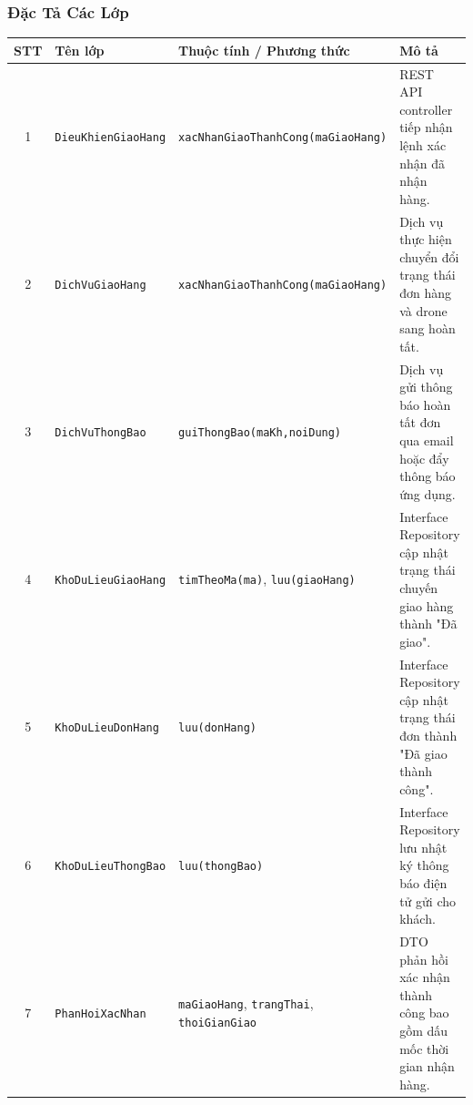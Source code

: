 \subsubsection{Đặc Tả Các Lớp}
\begin{table}[H]
  \centering
  \small
  \begin{tabularx}{\textwidth}{|c|>{\raggedright\arraybackslash}p{3.5cm}|>{\raggedright\arraybackslash}p{4.5cm}|>{\raggedright\arraybackslash}X|}
    \hline
    \textbf{STT} & \textbf{Tên lớp} & \textbf{Thuộc tính / Phương thức} & \textbf{Mô tả} \\
    \hline
    1 & \texttt{Dieu\allowbreak Khien\allowbreak Giao\allowbreak Hang} & \texttt{xac\allowbreak Nhan\allowbreak Giao\allowbreak Thanh\allowbreak Cong\allowbreak (ma\allowbreak Giao\allowbreak Hang)} & REST API controller tiếp nhận lệnh xác nhận đã nhận hàng. \\ \hline
    2 & \texttt{Dich\allowbreak Vu\allowbreak Giao\allowbreak Hang} & \texttt{xac\allowbreak Nhan\allowbreak Giao\allowbreak Thanh\allowbreak Cong\allowbreak (ma\allowbreak Giao\allowbreak Hang)} & Dịch vụ thực hiện chuyển đổi trạng thái đơn hàng và drone sang hoàn tất. \\ \hline
    3 & \texttt{Dich\allowbreak Vu\allowbreak Thong\allowbreak Bao} & \texttt{gui\allowbreak Thong\allowbreak Bao\allowbreak (ma\allowbreak Kh,\allowbreak noi\allowbreak Dung)} & Dịch vụ gửi thông báo hoàn tất đơn qua email hoặc đẩy thông báo ứng dụng. \\ \hline
    4 & \texttt{Kho\allowbreak Du\allowbreak Lieu\allowbreak Giao\allowbreak Hang} & \texttt{tim\allowbreak Theo\allowbreak Ma\allowbreak (ma)}, \texttt{luu\allowbreak (giao\allowbreak Hang)} & Interface Repository cập nhật trạng thái chuyến giao hàng thành "Đã giao". \\ \hline
    5 & \texttt{Kho\allowbreak Du\allowbreak Lieu\allowbreak Don\allowbreak Hang} & \texttt{luu\allowbreak (don\allowbreak Hang)} & Interface Repository cập nhật trạng thái đơn thành "Đã giao thành công". \\ \hline
    6 & \texttt{Kho\allowbreak Du\allowbreak Lieu\allowbreak Thong\allowbreak Bao} & \texttt{luu\allowbreak (thong\allowbreak Bao)} & Interface Repository lưu nhật ký thông báo điện tử gửi cho khách. \\ \hline
    7 & \texttt{Phan\allowbreak Hoi\allowbreak Xac\allowbreak Nhan} & \texttt{ma\allowbreak Giao\allowbreak Hang}, \texttt{trang\allowbreak Thai}, \texttt{thoi\allowbreak Gian\allowbreak Giao} & DTO phản hồi xác nhận thành công bao gồm dấu mốc thời gian nhận hàng. \\ \hline

\end{tabularx}
\end{table}
